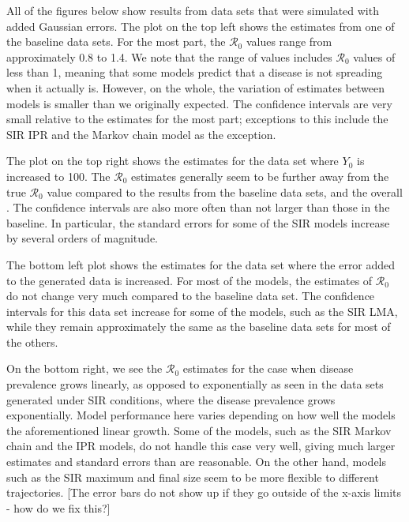 \documentclass[12pt]{article}
\newcommand{\rr}{\ensuremath{\mathcal{R}_0}}
\begin{document}
All of the figures below show results from data sets that were simulated with added Gaussian errors. The plot on the top left shows the estimates from one of the baseline data sets. For the most part, the $\rr$ values range from approximately 0.8 to 1.4. We note that the range of values includes $\rr$ values of less than 1, meaning that some models predict that a disease is not spreading when it actually is. However, on the whole, the variation of estimates between models is smaller than we originally expected. The confidence intervals are very small relative to the estimates for the most part; exceptions to this include the SIR IPR and the Markov chain model as the exception. 

The plot on the top right shows the estimates for the data set where $Y_0$ is increased to 100. The $\rr$ estimates generally seem to be further away from the true $\rr$ value compared to the results from the baseline data sets, and the overall . The confidence intervals are also more often than not larger than those in the baseline. In particular, the standard errors for some of the SIR models increase by several orders of magnitude.

The bottom left plot shows the estimates for the data set where the error added to the generated data is increased. For most of the models, the estimates of $\rr$ do not change very much compared to the baseline data set. The confidence intervals for this data set increase for some of the models, such as the SIR LMA, while they remain approximately the same as the baseline data sets for most of the others.

On the bottom right, we see the $\rr$ estimates for the case when disease prevalence grows linearly, as opposed to exponentially as seen in the data sets generated under SIR conditions, where the disease prevalence grows exponentially. Model performance here varies depending on how well the models the aforementioned linear growth. Some of the models, such as the SIR Markov chain and the IPR models, do not handle this case very well, giving much larger estimates and standard errors than are reasonable. On the other hand, models such as the SIR maximum and final size seem to be more flexible to different trajectories. [The error bars do not show up if they go outside of the x-axis limits - how do we fix this?]
\end{document}
